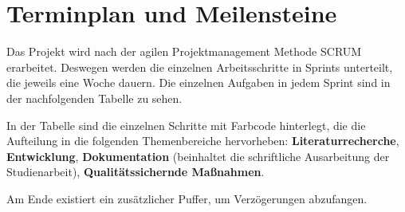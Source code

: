 


\newcommand{\Titel}{Projektplan}





\section{Terminplan und Meilensteine}
Das Projekt wird nach der agilen Projektmanagement Methode SCRUM erarbeitet.
Deswegen werden die einzelnen Arbeitsschritte in Sprints unterteilt, die jeweils eine Woche dauern.
Die einzelnen Aufgaben in jedem Sprint sind in der nachfolgenden Tabelle zu sehen.

In der Tabelle sind die einzelnen Schritte mit Farbcode hinterlegt, die die Aufteilung in die folgenden Themenbereiche hervorheben: \textcolor{literaturrecherche}{\textbf{Literaturrecherche}}, \textcolor{entwicklung}{\textbf{Entwicklung}}, \textcolor{dokumentation}{\textbf{Dokumentation}} (beinhaltet die schriftliche Ausarbeitung der Studienarbeit), \textcolor{QS}{\textbf{Qualitätssichernde Maßnahmen}}.

Am Ende existiert ein zusätzlicher Puffer, um Verzögerungen abzufangen.


